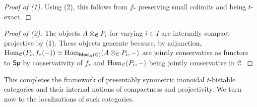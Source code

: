 \begin{proof}[Proof of (1)]
    Using  (2), this follows from $f_{*}$ preserving small colimits and being $t$-exact. 
\end{proof}
\begin{proof}[Proof of (2)]
    The objects $A\otimes_{\EuScript{C}}P_{i}$ for varying $i\in I$ are internally compact projective by (1). These objects generate because, by adjunction, $\mathrm{Hom}_{\EuScript{C}}(P_{i},f_{*}(-))\simeq\mathrm{Hom}_{\mathsf{Mod}_{A}(\EuScript{C})}(A\otimes_{\EuScript{C}}P_{i},-)$ are jointly conservative as functors to $\mathsf{Sp}$ by conservativity of $f_{*}$ and $\mathrm{Hom}_{\EuScript{C}}(P_{i},-)$ being jointly conservative in $\EuScript{C}$. 
\end{proof}
This completes the framework of presentably symmetric monoidal $t$-bistable categories and their internal notions of compactness and projectivity. We turn now to the localizations of such categories.
